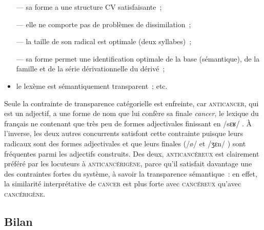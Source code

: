 \documentclass[output=paper]{langsci/langscibook}
\begin{document}
\begin{itemize}
\item[---] sa forme a une structure CV satisfaisante~;
\item[---] elle ne comporte pas de problèmes de dissimilation~;
\item[---] la taille de son radical est optimale (deux syllabes)~;
\item[---] sa forme permet une identification optimale de la base (sémantique), de la famille et de la série dérivationnelle du dérivé~;
\item  le lexème est sémantiquement transparent~; etc.
\end{itemize}
Seule la contrainte de transparence catégorielle est enfreinte, car
\textsc{anticancer}, qui est un adjectif, a une forme  de nom que lui confère  sa finale \emph{cancer},
le lexique du français ne contenant que très peu de formes adjectivales finissant en /sɛʁ/%
.  À l'inverse, les deux autres concurrents satisfont cette contrainte puisque leurs radicaux sont des formes adjectivales et que leurs finales (/ø/%
 et /ʒɛn/%
) sont fréquentes parmi les adjectifs construits.  Des deux, \textsc{anticancéreux} est clairement préféré par les locuteurs à \textsc{anticancérigène}, parce qu'il satisfait davantage une des contraintes fortes du système, à savoir la transparence sémantique~: en effet, la similarité interprétative de \textsc{cancer}  est plus forte avec \textsc{cancéreux}   qu'avec \textsc{cancérigène}.


\subsection{Bilan}
\label{sec:bilan-morpho-reseau}
\end{document}
